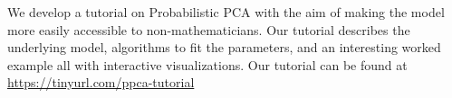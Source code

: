 We develop a tutorial on Probabilistic PCA with the aim of making the model more easily accessible to non-mathematicians. Our tutorial describes the underlying model, algorithms to fit the parameters, and an interesting worked example all with interactive visualizations. Our tutorial can be found at \url{https://tinyurl.com/ppca-tutorial}